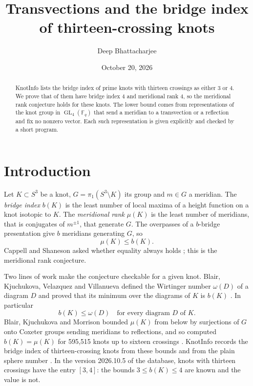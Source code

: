 \documentclass[11pt]{amsart}
\title{Transvections and the bridge index of thirteen-crossing knots}
\author{Deep Bhattacharjee}
\date{October 20, 2026}
\theoremstyle{definition}
\theoremstyle{remark}
\newcommand{\F}{\mathbb{F}}
\DeclareMathOperator{\GL}{GL}
\begin{document}
\begin{abstract}
KnotInfo lists the bridge index of \ntotal{} prime knots with thirteen crossings as
either $3$ or $4$. We prove that \nclosed{} of them have bridge index $4$ and meridional
rank $4$, so the meridional rank conjecture holds for these knots. The lower bound comes
from representations of the knot group in $\GL_4(\F_q)$ that send a meridian to a
transvection or a reflection and fix no nonzero vector. Each such representation is
given explicitly and checked by a short program.
\end{abstract}
\maketitle

\section{Introduction}

Let $K\subset S^3$ be a knot, $G=\pi_1(S^3\setminus K)$ its group and $m\in G$ a meridian.
The \emph{bridge index} $b(K)$ is the least number of local maxima of a height function on
a knot isotopic to $K$. The \emph{meridional rank} $\mu(K)$ is the least number of
meridians, that is conjugates of $m^{\pm1}$, that generate $G$. The overpasses of a
$b$-bridge presentation give $b$ meridians generating $G$, so
\[
\mu(K)\le b(K).
\]
Cappell and Shaneson asked whether equality always holds
\cite[Problem~1.11]{Kirby}; this is the meridional rank conjecture.

Two lines of work make the conjecture checkable for a given knot. Blair, Kjuchukova,
Velazquez and Villanueva defined the Wirtinger number $\omega(D)$ of a diagram $D$ and
proved that its minimum over the diagrams of $K$ is $b(K)$ \cite{BKVV}. In particular
\begin{equation}\label{eq:upper}
b(K)\le\omega(D)\quad\text{for every diagram $D$ of $K$.}
\end{equation}
Blair, Kjuchukova and Morrison bounded $\mu(K)$ from below by surjections of $G$ onto
Coxeter groups sending meridians to reflections, and so computed $b(K)=\mu(K)$ for
595{,}515 knots up to sixteen crossings \cite{BKM}. KnotInfo \cite{KnotInfo} records the
bridge index of thirteen-crossing knots from these bounds and from the plain sphere
number \cite{BKP}. In the version 2026.10.5 of the database, \ntotal{} knots with thirteen
crossings have the entry $[3,4]$: the bounds $3\le b(K)\le4$ are known and the value is
not.
\end{document}

